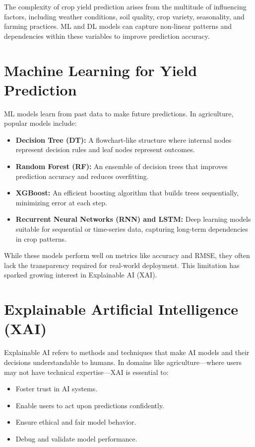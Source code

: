\documentclass[a4paper,11pt,oneside]{book}
\begin{document}
The complexity of crop yield prediction arises from the multitude of influencing factors, including weather conditions, soil quality, crop variety, seasonality, and farming practices. ML and DL models can capture non-linear patterns and dependencies within these variables to improve prediction accuracy.

\section{Machine Learning for Yield Prediction}

ML models learn from past data to make future predictions. In agriculture, popular models include:

\begin{itemize}
    \item \textbf{Decision Tree (DT):} A flowchart-like structure where internal nodes represent decision rules and leaf nodes represent outcomes.
    \item \textbf{Random Forest (RF):} An ensemble of decision trees that improves prediction accuracy and reduces overfitting.
    \item \textbf{XGBoost:} An efficient boosting algorithm that builds trees sequentially, minimizing error at each step.
    \item \textbf{Recurrent Neural Networks (RNN) and LSTM:} Deep learning models suitable for sequential or time-series data, capturing long-term dependencies in crop patterns.
\end{itemize}

While these models perform well on metrics like accuracy and RMSE, they often lack the transparency required for real-world deployment. This limitation has sparked growing interest in Explainable AI (XAI).

\section{Explainable Artificial Intelligence (XAI)}

Explainable AI refers to methods and techniques that make AI models and their decisions understandable to humans. In domains like agriculture—where users may not have technical expertise—XAI is essential to:
\begin{itemize}
    \item Foster trust in AI systems.
    \item Enable users to act upon predictions confidently.
    \item Ensure ethical and fair model behavior.
    \item Debug and validate model performance.
\end{itemize}
\end{document}
